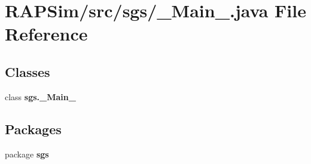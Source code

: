 \section{R\-A\-P\-Sim/src/sgs/\-\_\-\-Main\-\_\-.java File Reference}
\label{___main___8java}
\subsection*{Classes}
\begin{DoxyCompactItemize}
\item 
class {\bf sgs.\-\_\-\-Main\-\_\-}
\end{DoxyCompactItemize}
\subsection*{Packages}
\begin{DoxyCompactItemize}
\item 
package {\bf sgs}
\end{DoxyCompactItemize}
